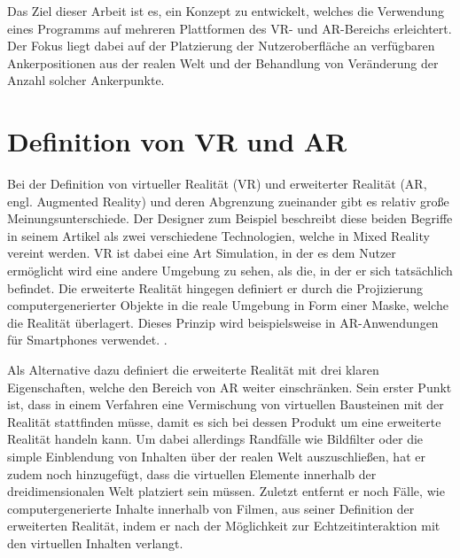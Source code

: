 	
	Das Ziel dieser Arbeit ist es, ein Konzept zu entwickelt, welches die Verwendung eines Programms auf mehreren Plattformen des VR- und AR-Bereichs erleichtert. Der Fokus liegt dabei auf der Platzierung der Nutzeroberfläche an verfügbaren Ankerpositionen aus der realen Welt und der Behandlung von Veränderung der Anzahl solcher Ankerpunkte.
	
	\section{Definition von VR und AR}
	Bei der Definition von virtueller Realität (VR) und erweiterter Realität (AR, engl. Augmented Reality) und deren Abgrenzung zueinander gibt es relativ große Meinungsunterschiede. Der Designer  zum Beispiel beschreibt diese beiden Begriffe in seinem Artikel  als zwei verschiedene Technologien, welche in Mixed Reality vereint werden. VR ist dabei eine Art Simulation, in der es dem Nutzer ermöglicht wird eine andere Umgebung zu sehen, als die, in der er sich tatsächlich befindet. Die erweiterte Realität hingegen definiert er durch die Projizierung computergenerierter Objekte in die reale Umgebung in Form einer Maske, welche die Realität überlagert.
	Dieses Prinzip wird beispielsweise in AR-Anwendungen für Smartphones verwendet.\cite{tidjane} . 
	
	Als Alternative dazu definiert  die erweiterte Realität mit drei klaren Eigenschaften, welche den Bereich von AR weiter einschränken. Sein erster Punkt ist, dass in einem Verfahren eine Vermischung von virtuellen Bausteinen mit der Realität stattfinden müsse, damit es sich bei dessen Produkt um eine erweiterte Realität handeln kann. Um dabei allerdings Randfälle wie Bildfilter oder die simple Einblendung von Inhalten über der realen Welt auszuschließen, hat er zudem noch hinzugefügt, dass die virtuellen Elemente innerhalb der dreidimensionalen Welt platziert sein müssen. Zuletzt entfernt er noch Fälle, wie computergenerierte Inhalte innerhalb von Filmen, aus seiner Definition der erweiterten Realität, indem er nach der Möglichkeit zur Echtzeitinteraktion mit den virtuellen Inhalten verlangt.\cite{azuma}
	
	
	
